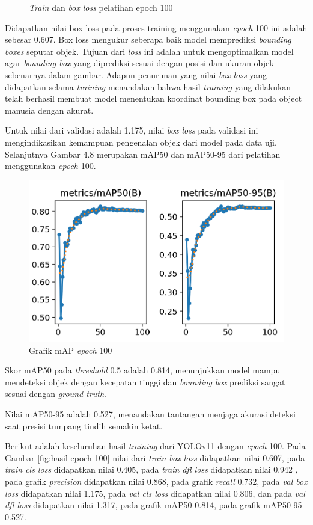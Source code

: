 \begin{figure} [H]
  \caption{\emph{Train} dan \emph{box loss} pelatihan epoch 100}
  \label{fig:Pengujian Performa train dan val epoch 100}
\end{figure}
Didapatkan nilai box loss pada proses training menggunakan \emph{epoch} 100 ini adalah sebesar
0.607. Box loss mengukur seberapa baik model memprediksi \emph{bounding
boxes} seputar objek. Tujuan dari \emph{loss} ini adalah untuk mengoptimalkan model agar \emph{bounding
box} yang diprediksi sesuai dengan posisi dan ukuran objek sebenarnya dalam gambar. Adapun penurunan yang nilai \emph{box loss} yang didapatkan selama \emph{training} menandakan bahwa hasil \emph{training} yang dilakukan telah berhasil membuat model menentukan koordinat bounding box pada
object manusia dengan akurat.

Untuk nilai dari validasi adalah 1.175, nilai \emph{box loss} pada validasi ini mengindikasikan kemampuan pengenalan objek dari model pada data uji. Selanjutnya Gambar 4.8 merupakan mAP50 dan mAP50-95 dari pelatihan menggunakan \emph{epoch} 100.
\begin{figure} [H] \centering
  \includegraphics[scale=0.55]{gambar/mAP epoch 100.png}
  \caption{Grafik mAP \emph{epoch} 100}
  \label{fig:mAP epoch 100}
\end{figure}
Skor mAP50 pada \emph{threshold} 0.5 adalah 0.814, menunjukkan model mampu mendeteksi objek dengan kecepatan tinggi dan \emph{bounding box} prediksi sangat sesuai dengan \emph{ground truth}.

Nilai mAP50-95 adalah 0.527, menandakan tantangan menjaga akurasi deteksi saat presisi tumpang tindih semakin ketat.

Berikut adalah keseluruhan hasil \emph{training} dari YOLOv11 dengan \emph{epoch} 100. Pada Gambar \ref{fig:hasil epoch 100} nilai dari \emph{train box loss} didapatkan nilai 0.607, pada \emph{train cls loss} didapatkan nilai 0.405, pada \emph{train dfl loss} didapatkan nilai 0.942 , pada grafik \emph{precision} didapatkan nilai 0.868, pada grafik \emph{recall} 0.732, pada \emph{val box loss} didapatkan nilai 1.175, pada \emph{val cls loss} didapatkan nilai 0.806, dan pada \emph{val dfl loss} didapatkan nilai 1.317,  pada grafik mAP50 0.814, pada grafik mAP50-95 0.527.

